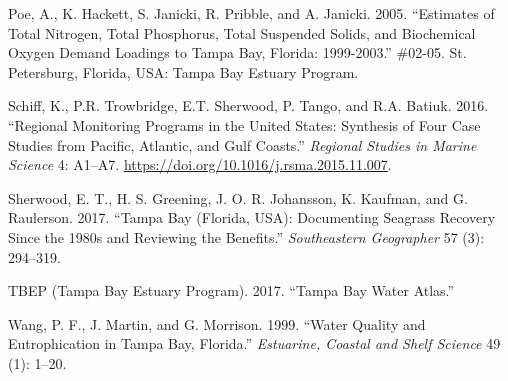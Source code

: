 \documentclass[]{article}
\begin{document}
\hypertarget{ref-Poe05}{}
Poe, A., K. Hackett, S. Janicki, R. Pribble, and A. Janicki. 2005.
``Estimates of Total Nitrogen, Total Phosphorus, Total Suspended Solids,
and Biochemical Oxygen Demand Loadings to Tampa Bay, Florida:
1999-2003.'' \#02-05. St. Petersburg, Florida, USA: Tampa Bay Estuary
Program.

\hypertarget{ref-Schiff16}{}
Schiff, K., P.R. Trowbridge, E.T. Sherwood, P. Tango, and R.A. Batiuk.
2016. ``Regional Monitoring Programs in the United States: Synthesis of
Four Case Studies from Pacific, Atlantic, and Gulf Coasts.''
\emph{Regional Studies in Marine Science} 4: A1--A7.
\url{https://doi.org/10.1016/j.rsma.2015.11.007}.

\hypertarget{ref-Sherwood17}{}
Sherwood, E. T., H. S. Greening, J. O. R. Johansson, K. Kaufman, and G.
Raulerson. 2017. ``Tampa Bay (Florida, USA): Documenting Seagrass
Recovery Since the 1980s and Reviewing the Benefits.''
\emph{Southeastern Geographer} 57 (3): 294--319.

\hypertarget{ref-TBEP17}{}
TBEP (Tampa Bay Estuary Program). 2017. ``Tampa Bay Water Atlas.''

\hypertarget{ref-Wang99}{}
Wang, P. F., J. Martin, and G. Morrison. 1999. ``Water Quality and
Eutrophication in Tampa Bay, Florida.'' \emph{Estuarine, Coastal and
Shelf Science} 49 (1): 1--20.
\end{document}
